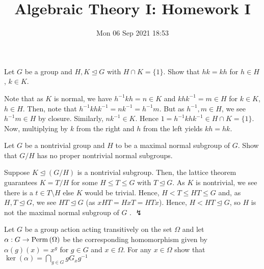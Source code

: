 \documentclass[a4paper]{article}
\title{Algebraic Theory I: Homework I}
\date{Mon 06 Sep 2021 18:53}
\begin{document}
\maketitle
\begin{problem}[1]
	Let \(G\) be a group and \(H, K \trianglelefteq G\) with \(H \cap K = \{1\} \). Show that \(hk = kh\) for \(h \in H\), \(k \in K\).
\end{problem}
\begin{solution}
	Note that as \(K\) is normal, we have \(h^{-1} k h = n\in K\) and \(kh k^{-1} = m\in H\) for \(k \in K\), \(h \in H\). Then, note that \(h^{-1} k h k^{-1} = nk^{-1} = h^{-1} m\). But as \(h^{-1}, m \in H\), we see \(h^{-1} m \in H\) by closure. Similarly, \(nk^{-1} \in K\). Hence \(1= h^{-1} k h k^{-1} \in H \cap K = \{1\} \). Now, multiplying by \(k\) from the right and \(h\) from the left yields \(kh = hk\).
\end{solution}
\newpage
\begin{problem}[2]
	Let \(G\) be a nontrivial group and \(H\) to be a maximal normal subgroup of \(G\). Show that \(G / H\) has no proper nontrivial normal subgroups.
\end{problem}
\begin{solution}
	Suppose \(K \trianglelefteq  (G / H)\) is a  nontrivial subgroup. Then, the lattice theorem guarantees \(K = T / H\) for some \(H \le T \le G\) with \(T \trianglelefteq G\). As \(K\) is nontrivial, we see there is a \(t \in T \setminus H\) else \(K\) would be trivial. Hence, \(H < T \le HT \le G\) and, as \(H, T \trianglelefteq G\), we see \(HT \trianglelefteq G\) (as \(xHT = HxT = HTx\)). Hence, \(H < HT \trianglelefteq G\), so \(H\) is not the maximal normal subgroup of \( G\) . \(\lightning\)
\end{solution}
\newpage
\begin{problem}[3]
	Let \(G\) be a group action acting transitively on the set \(\Omega\) and let \(\alpha: G \to \operatorname{Perm} \left( \Omega \right) \) be the corresponding homomorphism given by \(\alpha \left( g \right) \left( x \right)  = x^{g}\) for \(g \in G\) and \(x \in \Omega\). For any \(x \in \Omega\) show that \(\ker \left( \alpha \right)  = \bigcap_{g \in G} gG_{x}g^{-1}\)
\end{problem}
\end{document}
